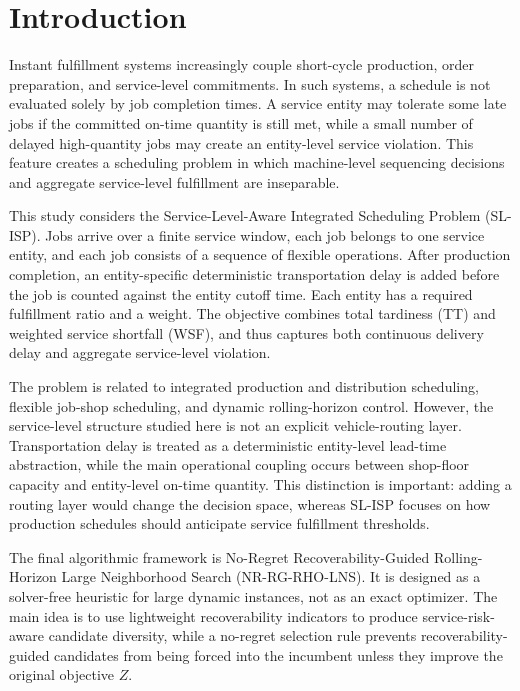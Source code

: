 \documentclass[a4paper,fleqn]{cas-sc}
\begin{document}
\maketitle

\section{Introduction}
\label{sec:introduction}

Instant fulfillment systems increasingly couple short-cycle production, order preparation, and service-level commitments. In such systems, a schedule is not evaluated solely by job completion times. A service entity may tolerate some late jobs if the committed on-time quantity is still met, while a small number of delayed high-quantity jobs may create an entity-level service violation. This feature creates a scheduling problem in which machine-level sequencing decisions and aggregate service-level fulfillment are inseparable.

This study considers the Service-Level-Aware Integrated Scheduling Problem (SL-ISP). Jobs arrive over a finite service window, each job belongs to one service entity, and each job consists of a sequence of flexible operations. After production completion, an entity-specific deterministic transportation delay is added before the job is counted against the entity cutoff time. Each entity has a required fulfillment ratio and a weight. The objective combines total tardiness (TT) and weighted service shortfall (WSF), and thus captures both continuous delivery delay and aggregate service-level violation.

The problem is related to integrated production and distribution scheduling, flexible job-shop scheduling, and dynamic rolling-horizon control. However, the service-level structure studied here is not an explicit vehicle-routing layer. Transportation delay is treated as a deterministic entity-level lead-time abstraction, while the main operational coupling occurs between shop-floor capacity and entity-level on-time quantity. This distinction is important: adding a routing layer would change the decision space, whereas SL-ISP focuses on how production schedules should anticipate service fulfillment thresholds.

The final algorithmic framework is No-Regret Recoverability-Guided Rolling-Horizon Large Neighborhood Search (NR-RG-RHO-LNS). It is designed as a solver-free heuristic for large dynamic instances, not as an exact optimizer. The main idea is to use lightweight recoverability indicators to produce service-risk-aware candidate diversity, while a no-regret selection rule prevents recoverability-guided candidates from being forced into the incumbent unless they improve the original objective \(Z\).
\end{document}
